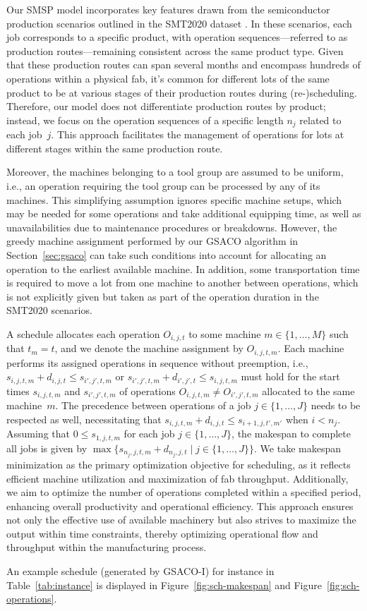 Our SMSP model incorporates key features drawn from the semiconductor production 
scenarios outlined in the SMT2020 dataset \cite{kopp2020smt2020}. 
In these scenarios, each job corresponds to a specific product, 
with operation sequences—referred to as production routes—remaining 
consistent across the same product type. Given that these production routes 
can span several months and encompass hundreds of operations within a physical fab, 
it's common for different lots of the same product to be at various stages 
of their production routes during (re-)scheduling. 
Therefore, our model does not differentiate production routes by product; 
instead, we focus on the operation sequences of a specific length $n_j$ related to each job~$j$. 
This approach facilitates the management of operations for lots at different stages within the same production route.

Moreover, the machines belonging to a tool group are assumed to be uniform,
i.e., an operation requiring the tool group can be processed by any of its
machines.
This simplifying assumption ignores specific machine setups, which may be
needed for some operations and take additional equipping time,
as well as unavailabilities due to maintenance procedures or breakdowns.
However, the greedy machine assignment performed by our GSACO algorithm
in Section~\ref{sec:gsaco} can take such conditions into account for
allocating an operation to the earliest available machine.
In addition, some transportation time is required to move
a lot from one machine to another between operations,
which is not explicitly given but taken as part of the operation duration
in the SMT2020 scenarios.

A schedule allocates each operation $O_{i,j,t}$ to some machine
$m\in\{1,\dots,M\}$ such that $t_m=t$, and we denote the machine
assignment by $O_{i,j,t,m}$.
Each machine performs its assigned operations in sequence without
preemption, i.e.,
$s_{i,j,t,m} + d_{i,j,t} \leq s_{i',j',t,m}$ or
$s_{i',j',t,m} + d_{i',j',t} \leq s_{i,j,t,m}$
must hold for the start times
$s_{i,j,t,m}$ and $s_{i',j',t,m}$ of operations
$O_{i,j,t,m}\neq O_{i',j',t,m}$
allocated to the same machine~$m$.
The precedence between operations of a job $j\in\{1,\dots,J\}$ needs to be
respected as well, necessitating that
$s_{i,j,t,m} + d_{i,j,t} \leq s_{i+1,j,t',m'}$ when $i<n_j$.
Assuming that $0\leq s_{1,j,t,m}$ for each job $j\in\{1,\dots,J\}$,
the makespan to complete all jobs is given by
$\max\{s_{n_j,j,t,m} + d_{n_j,j,t} \mid j\in\{1,\dots,J\}\}$.
We take makespan minimization as the primary optimization objective for scheduling, as it reflects efficient machine utilization and maximization of fab throughput. Additionally, we aim to optimize the number of operations completed within a specified period, enhancing overall productivity and operational efficiency. This approach ensures not only the effective use of available machinery but also strives to maximize the output within time constraints, thereby optimizing operational flow and throughput within the manufacturing process.

An example schedule (generated by GSACO-I) for instance in Table~\ref{tab:instance} 
is displayed in Figure~\ref{fig:sch-makespan} and Figure~\ref{fig:sch-operations}.